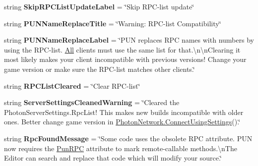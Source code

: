 \begin{DoxyCompactItemize}
\item 
string {\bfseries Skip\+R\+P\+C\+List\+Update\+Label} = \char`\"{}Skip R\+PC-\/list update\char`\"{}\hypertarget{class_pun_wizard_text_a7847e10a84d1d79652a61a148beb650a}{}\label{class_pun_wizard_text_a7847e10a84d1d79652a61a148beb650a}

\item 
string {\bfseries P\+U\+N\+Name\+Replace\+Title} = \char`\"{}Warning\+: R\+PC-\/list Compatibility\char`\"{}\hypertarget{class_pun_wizard_text_a645cbabea2e9ffdad71e2689d137ce54}{}\label{class_pun_wizard_text_a645cbabea2e9ffdad71e2689d137ce54}

\item 
string {\bfseries P\+U\+N\+Name\+Replace\+Label} = \char`\"{}P\+UN replaces R\+PC names with numbers by using the R\+PC-\/list. \hyperlink{group__public_api_ggab84b274b6aa3b3a3d7810361da16170fab1c94ca2fbc3e78fc30069c8d0f01680}{All} clients must use the same list for that.\textbackslash{}n\textbackslash{}n\+Clearing it most likely makes your client incompatible with previous versions! Change your game version or make sure the R\+PC-\/list matches other clients.\char`\"{}\hypertarget{class_pun_wizard_text_a8b38849007b7e021a16bbe6daaadd0e8}{}\label{class_pun_wizard_text_a8b38849007b7e021a16bbe6daaadd0e8}

\item 
string {\bfseries R\+P\+C\+List\+Cleared} = \char`\"{}Clear R\+PC-\/list\char`\"{}\hypertarget{class_pun_wizard_text_a089960fd554d43f35d1cf51a320bdd99}{}\label{class_pun_wizard_text_a089960fd554d43f35d1cf51a320bdd99}

\item 
string {\bfseries Server\+Settings\+Cleaned\+Warning} = \char`\"{}Cleared the Photon\+Server\+Settings.\+Rpc\+List! This makes new builds incompatible with older ones. Better change game version in \hyperlink{class_photon_network_a0fdb79bcce45801ec81fbe56ffb939ec}{Photon\+Network.\+Connect\+Using\+Settings}().\char`\"{}\hypertarget{class_pun_wizard_text_a1fcd4eff5d7841e61870ac8fe2e2158d}{}\label{class_pun_wizard_text_a1fcd4eff5d7841e61870ac8fe2e2158d}

\item 
string {\bfseries Rpc\+Found\+Message} = \char`\"{}Some code uses the obsolete R\+PC attribute. P\+UN now requires the \hyperlink{class_pun_r_p_c}{Pun\+R\+PC} attribute to mark remote-\/callable methods.\textbackslash{}n\+The Editor can search and replace that code which will modify your source.\char`\"{}\hypertarget{class_pun_wizard_text_a08d2f13d94fb1fe3f7e82954fce4688d}{}\label{class_pun_wizard_text_a08d2f13d94fb1fe3f7e82954fce4688d}


\end{DoxyCompactItemize}

